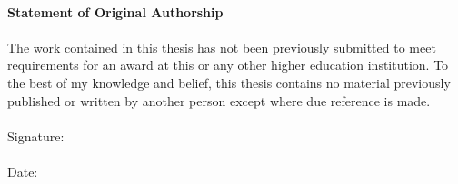 




~
\newpage
~\\
\vfill

\textbf{Statement of Original Authorship} \\
~\\
The work contained in this thesis has not been previously submitted to meet requirements for an award at this or any other higher education institution. To the best of my knowledge and belief, this thesis contains no material previously published or written by another person except where due reference is made.\\
~\\
Signature:\\
~\\
Date:\\